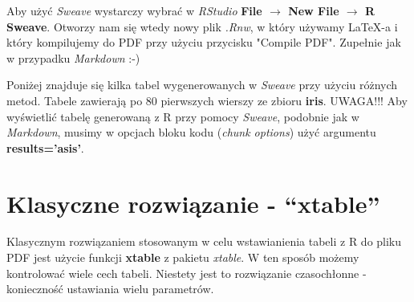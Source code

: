 \documentclass[a4paper, 10pt]{article}\usepackage[]{graphicx}\usepackage[]{color}
\begin{document}
Aby użyć \emph{Sweave} wystarczy wybrać w \emph{RStudio} \textbf{File $\rightarrow$ New File $\rightarrow$ R Sweave}. Otworzy nam się wtedy nowy plik \emph{.Rnw}, w który używamy LaTeX-a i który kompilujemy do PDF przy użyciu przycisku "Compile PDF". Zupełnie jak w przypadku \emph{Markdown} :-)
\vspace{5mm}

Poniżej znajduje się kilka tabel wygenerowanych w \emph{Sweave} przy użyciu różnych metod. Tabele zawierają po 80 pierwszych wierszy ze zbioru \textbf{iris}. UWAGA!!!  Aby wyświetlić tabelę generowaną z R przy pomocy \emph{Sweave}, podobnie jak w \emph{Markdown}, musimy w opcjach bloku kodu (\emph{chunk options}) użyć argumentu \textbf{results='asis'}. 

\section{Klasyczne rozwiązanie - ``xtable''}

Klasycznym rozwiązaniem stosowanym w celu wstawianienia tabeli z R do pliku PDF jest użycie funkcji \textbf{xtable} z pakietu \emph{xtable}. W ten sposób możemy kontrolować wiele cech tabeli. Niestety jest to rozwiązanie czasochłonne - konieczność ustawiania wielu parametrów.
\end{document}
